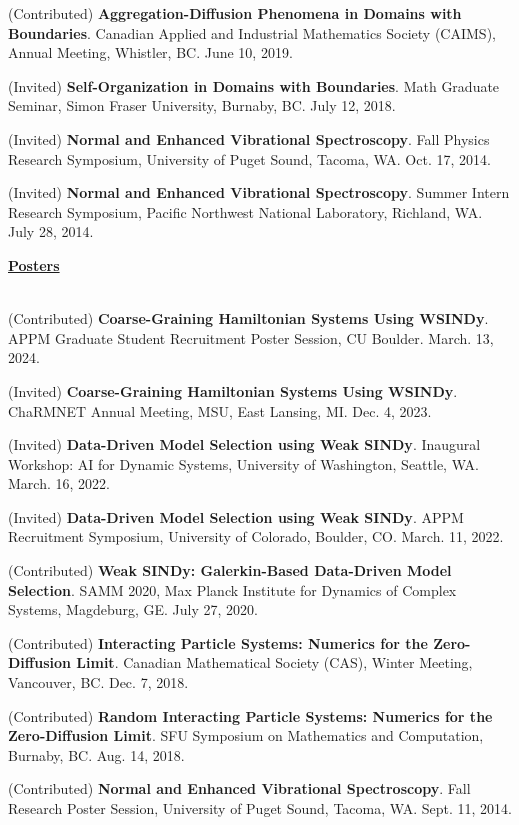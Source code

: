 \documentclass[letterpaper,11pt,oneside]{article}
\newcommand{\headr}[1]{\vspace{10pt}\uline{\Large{\textbf{#1}} \hfill } \\ \vspace{-10pt}\\}
\begin{document}
\begin{enumerate}[label={[\arabic*]}]
\item (Contributed) \textbf{Aggregation-Diffusion Phenomena in Domains with Boundaries}. Canadian Applied and Industrial Mathematics Society (CAIMS), Annual Meeting, Whistler, BC. June 10, 2019.
\item (Invited) \textbf{Self-Organization in Domains with Boundaries}. Math Graduate Seminar, Simon Fraser University, Burnaby, BC. July 12, 2018.
\item (Invited) \textbf{Normal and Enhanced Vibrational Spectroscopy}. Fall Physics Research Symposium, University of Puget Sound, Tacoma, WA. Oct. 17, 2014.
\item (Invited) \textbf{Normal and Enhanced Vibrational Spectroscopy}. Summer Intern Research Symposium, Pacific Northwest National Laboratory, Richland, WA. July 28, 2014.
\end{enumerate}

\headr{Posters} 
\vspace{-0.5cm}
\begin{enumerate}[label={[\arabic*]}]
\item (Contributed) \textbf{Coarse-Graining Hamiltonian Systems Using WSINDy}. APPM Graduate Student Recruitment Poster Session, CU Boulder. March. 13, 2024.
\item (Invited) \textbf{Coarse-Graining Hamiltonian Systems Using WSINDy}. ChaRMNET Annual Meeting, MSU, East Lansing, MI. Dec. 4, 2023.
\item (Invited) \textbf{Data-Driven Model Selection using Weak SINDy}. Inaugural Workshop: AI for Dynamic Systems, University of Washington, Seattle, WA. March. 16, 2022.
\item (Invited) \textbf{Data-Driven Model Selection using Weak SINDy}. APPM Recruitment Symposium, University of Colorado, Boulder, CO. March. 11, 2022.
\item (Contributed) \textbf{Weak SINDy: Galerkin-Based Data-Driven Model Selection}. SAMM 2020, Max Planck Institute for Dynamics of Complex Systems, Magdeburg, GE. July 27, 2020.
\item (Contributed) \textbf{Interacting Particle Systems: Numerics for the Zero-Diffusion Limit}. Canadian Mathematical Society (CAS), Winter Meeting, Vancouver, BC. Dec. 7, 2018.
\item (Contributed) \textbf{Random Interacting Particle Systems: Numerics for the Zero-Diffusion Limit}. SFU Symposium on Mathematics and Computation, Burnaby, BC. Aug. 14, 2018.
\item (Contributed) \textbf{Normal and Enhanced Vibrational Spectroscopy}. Fall Research Poster Session, University of Puget Sound, Tacoma, WA. Sept. 11, 2014.
\end{enumerate}
\end{document}

